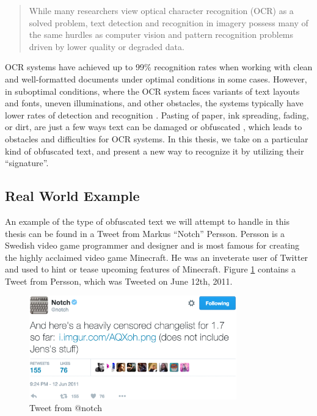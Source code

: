 \begin{quote}
    While many researchers view optical character recognition (OCR) as a solved problem, text detection and recognition in imagery possess many of the same hurdles as computer vision and pattern recognition problems driven by lower quality or degraded data.
\end{quote}

OCR systems have achieved up to 99\% recognition rates when working with clean and well-formatted documents under optimal conditions in some cases. However, in suboptimal conditions, where the OCR system faces variants of text layouts and fonts, uneven illuminations, and other obstacles, the systems typically have lower rates of detection and recognition \citep{ye2015text}. Pasting of paper, ink spreading, fading, or dirt, are just a few ways text can be damaged or obfuscated \citep{bhardwaj2014imaging}, which leads to obstacles and difficulties for OCR systems. In this thesis, we take on a particular kind of obfuscated text, and present a new way to recognize it by utilizing their ``signature''.

\subsection{Real World Example}
An example of the type of obfuscated text we will attempt to handle in this thesis can be found in a Tweet from Markus ``Notch'' Persson. Persson is a Swedish video game programmer and designer and is most famous for creating the highly acclaimed video game Minecraft. He was an inveterate user of Twitter and used to hint or tease upcoming features of Minecraft. Figure \ref{ref:notch_twitter} contains a Tweet from Persson, which was Tweeted on June 12th, 2011.

\begin{figure}[ht]
    \centering
    \includegraphics[width=0.8\textwidth]{fig/chapter1/notch_tweet.jpg}
    \caption{Tweet from @notch}
    \label{ref:notch_twitter}
\end{figure}

